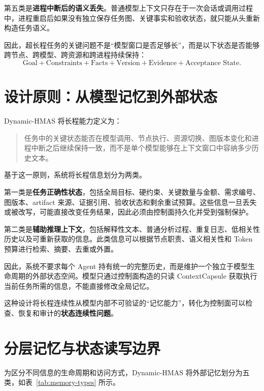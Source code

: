\documentclass[UTF8,a4paper,12pt,oneside]{ctexbook}
\begin{document}
第五类是\textbf{进程中断后的语义丢失}。普通模型上下文只存在于一次会话或调用过程中，进程重启后如果没有独立保存任务图、关键事实和验收状态，就只能从头重新构造任务语义。

因此，超长程任务的关键问题不是“模型窗口是否足够长”，而是以下状态是否能够跨节点、跨模型、跨资源和跨进程持续保持：
\[
\text{Goal}
+
\text{Constraints}
+
\text{Facts}
+
\text{Version}
+
\text{Evidence}
+
\text{Acceptance State}.
\]


\section{设计原则：从模型记忆到外部状态}

Dynamic-HMAS 将长程能力定义为：

\begin{quote}
任务中的关键状态能否在模型调用、节点执行、资源切换、图版本变化和进程中断之后继续保持一致，而不是单个模型能够在上下文窗口中容纳多少历史文本。
\end{quote}

基于这一原则，系统将长程信息划分为两类。

第一类是\textbf{任务正确性状态}，包括全局目标、硬约束、关键数量与金额、需求编号、图版本、artifact 来源、证据引用、验收状态和剩余重试预算。这些信息一旦丢失或被改写，可能直接改变任务结果，因此必须由控制面持久化并受到强制保护。

第二类是\textbf{辅助推理上下文}，包括解释性文本、普通分析过程、重复日志、低相关性历史以及可重新获取的信息。此类信息可以根据节点职责、语义相关性和 Token 预算进行检索、摘要、去重或外置。

因此，系统不要求每个 Agent 持有统一的完整历史，而是维护一个独立于模型生命周期的外部状态空间。模型只通过控制面构造的只读 ContextCapsule 获取执行当前任务所需的信息，不能直接修改全局记忆。

这种设计将长程连续性从模型内部不可验证的“记忆能力”，转化为控制面可以检查、恢复和审计的\textbf{状态连续性问题}。


\section{分层记忆与状态读写边界}

为区分不同信息的生命周期和访问方式，Dynamic-HMAS 将外部记忆划分为五类，如表~\ref{tab:memory-types} 所示。
\end{document}
